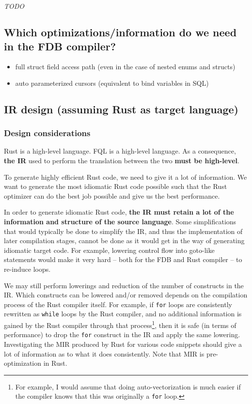 \documentclass[10pt,a4paper]{article}
\newcommand{\rust}[1]{\texttt{#1}}
\newcommand{\fql}[1]{\texttt{#1}}
\begin{document}
\textit{TODO}

\subsection{Which optimizations/information do we need in the FDB compiler?}

\begin{itemize}
\item full struct field access path (even in the case of nested enums and structs)
\item auto parameterized cursors (equivalent to bind variables in SQL)
\end{itemize}

\subsection{IR design (assuming Rust as target language)}

\subsubsection{Design considerations}

Rust is a high-level language.
FQL is a high-level language.
As a consequence, \textbf{the IR} used to perform the translation between the two \textbf{must be high-level}.

To generate highly efficient Rust code, we need to give it a lot of information.
We want to generate the most idiomatic Rust code possible such that the Rust optimizer can do the best job possible and give us the best performance.

In order to generate idiomatic Rust code, \textbf{the IR must retain a lot of the information and structure of the source language}.
Some simplifications that would typically be done to simplify the IR, and thus the implementation of later compilation stages, cannot be done as it would get in the way of generating idiomatic target code.
For example, lowering control flow into goto-like statements would make it very hard -- both for the FDB and Rust compiler -- to re-induce loops.

We may still perform lowerings and reduction of the number of constructs in the IR.
Which constructs can be lowered and/or removed depends on the compilation process of the Rust compiler itself.
For example, if \rust{for} loops are consistently rewritten as \rust{while} loops by the Rust compiler, and no additional information is gained by the Rust compiler through that process\footnote{
	For example, I would assume that doing auto-vectorization is much easier if the compiler knows that this was originally a \rust{for} loop.
}, then it is safe (in terms of performance) to drop the \fql{for} construct in the IR and apply the same lowering.
Investigating the MIR produced by Rust for various code snippets should give a lot of information as to what it does consistently.
Note that MIR is pre-optimization in Rust. 
\end{document}
